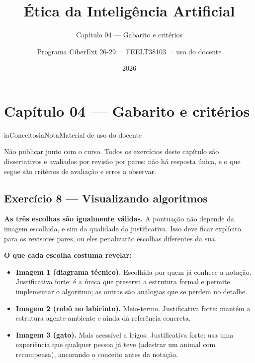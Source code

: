 \documentclass[
  11pt,
]{article}
\title{Ética da Inteligência Artificial}
\subtitle{Capítulo 04 --- Gabarito e critérios}
\author{Programa CiberExt 26-29 · FEELT38103 · uso do docente}
\date{2026}
\providecommand{\tightlist}{%
  \setlength{\itemsep}{0pt}\setlength{\parskip}{0pt}}
\newenvironment{nota}[1][Nota]{\begin{iabox}{iaConceitos}{iaNota}{#1}}{\end{iabox}}
\begin{document}
\maketitle

{
\hypersetup{linkcolor=iaConceitos}
\setcounter{tocdepth}{2}
\tableofcontents
}
\hypertarget{capuxedtulo-04-gabarito-e-crituxe9rios}{%
\section{Capítulo 04 --- Gabarito e
critérios}\label{capuxedtulo-04-gabarito-e-crituxe9rios}}

\begin{nota}[Material de uso do docente]

Não publicar junto com o curso. Todos os exercícios deste capítulo são
dissertativos e avaliados por revisão por pares: não há resposta única,
e o que segue são critérios de avaliação e erros a observar.

\end{nota}

\hypertarget{exercuxedcio-8-visualizando-algoritmos}{%
\subsection{Exercício 8 --- Visualizando
algoritmos}\label{exercuxedcio-8-visualizando-algoritmos}}

\textbf{As três escolhas são igualmente válidas.} A pontuação não
depende da imagem escolhida, e sim da qualidade da justificativa. Isso
deve ficar explícito para os revisores pares, ou eles penalizarão
escolhas diferentes da sua.

\textbf{O que cada escolha costuma revelar:}

\begin{itemize}
\tightlist
\item
  \textbf{Imagem 1 (diagrama técnico).} Escolhida por quem já conhece a
  notação. Justificativa forte: é a única que preserva a estrutura
  formal e permite implementar o algoritmo; as outras são analogias que
  se perdem no detalhe.
\item
  \textbf{Imagem 2 (robô no labirinto).} Meio-termo. Justificativa
  forte: mantém a estrutura agente-ambiente e ainda dá referência
  concreta.
\item
  \textbf{Imagem 3 (gato).} Mais acessível a leigos. Justificativa
  forte: usa uma experiência que qualquer pessoa já teve (adestrar um
  animal com recompensa), ancorando o conceito antes da notação.
\end{itemize}
\end{document}
